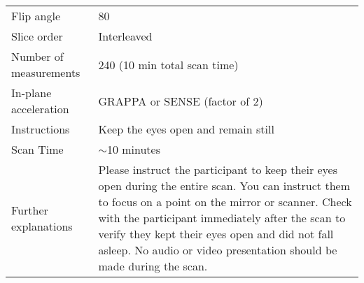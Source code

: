 \begin{table}[H]
\begin{tabularx}{\linewidth}{@{} s | X @{}}
Flip angle                                        					& 80                                          \\
Slice order                                       					& Interleaved                                 \\
Number of measurements                            			& 240 (10 min total scan time)                \\
In-plane acceleration                             				& GRAPPA or SENSE (factor of 2)               \\
Instructions                                      					& Keep the eyes open and remain still         \\
Scan Time                                         					& $\sim$10 minutes                            \\
Further explanations                              				& Please instruct the participant to keep their eyes open during the entire scan. You can instruct them to focus on a point on the mirror or scanner. Check with the participant immediately after the scan to verify they kept their eyes open and did not fall asleep. No audio or video presentation should be made during the scan.                                           
\end{tabularx}
\end{table}


